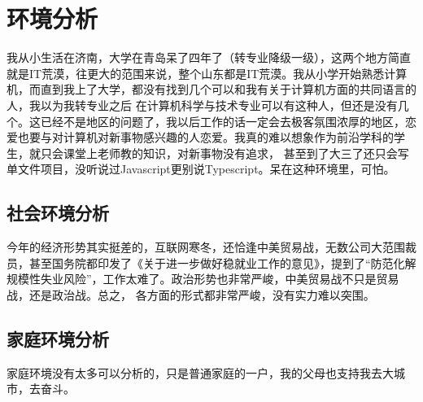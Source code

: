 \documentclass{article}
\begin{document}
\section{环境分析}
我从小生活在济南，大学在青岛呆了四年了（转专业降级一级），这两个地方简直就是IT荒漠，往更大的范围来说，整个山东都是IT荒漠。我从小学开始熟悉计算机，而直到我上了大学，都没有找到几个可以和我有关于计算机方面的共同语言的人，我以为我转专业之后
在计算机科学与技术专业可以有这种人，但还是没有几个。这已经不是地区的问题了，我以后工作的话一定会去极客氛围浓厚的地区，恋爱也要与对计算机对新事物感兴趣的人恋爱。我真的难以想象作为前沿学科的学生，就只会课堂上老师教的知识，对新事物没有追求，
甚至到了大三了还只会写单文件项目，没听说过Javascript更别说Typescript。呆在这种环境里，可怕。
\subsection{社会环境分析}
今年的经济形势其实挺差的，互联网寒冬，还恰逢中美贸易战，无数公司大范围裁员，甚至国务院都印发了《关于进一步做好稳就业工作的意见》，提到了“防范化解规模性失业风险”，工作太难了。政治形势也非常严峻，中美贸易战不只是贸易战，还是政治战。总之，
各方面的形式都非常严峻，没有实力难以突围。
\subsection{家庭环境分析}
家庭环境没有太多可以分析的，只是普通家庭的一户，我的父母也支持我去大城市，去奋斗。
\end{document}
